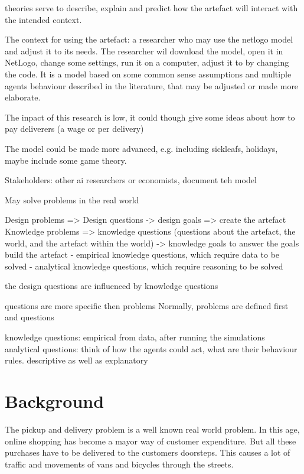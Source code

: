 theories serve to describe, explain and predict how
the artefact will interact with the intended context.

The context for using the artefact: a researcher who may use the netlogo model and adjust it to its needs.
The researcher wil download the model, open it in NetLogo, change some settings, run it on a computer, adjust it to by changing the code.
It is a model based on some common sense assumptions and multiple agents behaviour described in the literature, that may be adjusted or made more elaborate.

The inpact of this research is low, it could though give some ideas about how to pay deliverers (a wage or per delivery)

The model could be made more advanced, e.g. including sickleafs, holidays, maybe include some game theory.

Stakeholders: other ai researchers or economists, document teh model

May solve problems in the real world

Design problems => Design questions -> design goals => create the artefact
Knowledge problems => knowledge questions (questions about the artefact, the world, and the artefact within the world) -> knowledge goals  to answer the goals build the artefact
- empirical knowledge questions, which require data to be solved
- analytical knowledge questions, which require reasoning to be solved

the design questions are influenced by knowledge questions

questions are more specific then problems
Normally, problems are defined first and questions

knowledge questions: empirical from data, after running the simulations
analytical questions:  think of how the agents could act, what are their behaviour rules. descriptive as well as explanatory












\section{Background}
The pickup and delivery problem is a well known real world problem.
In this age, online shopping has become a mayor way of customer expenditure.
But all these purchases have to be delivered to the customers doorsteps.
This causes a lot of traffic and movements of vans and bicycles through the streets.

